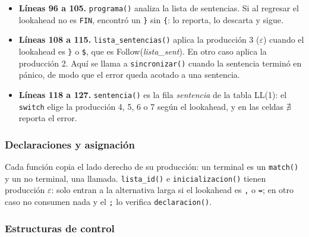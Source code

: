 \documentclass[12pt]{article}
\newcommand{\cmd}[1]{\texttt{\small #1}}
\newcommand{\nt}[1]{\textit{#1}}
\begin{document}


\begin{itemize}[leftmargin=1.1cm,itemsep=0.25em]
\item \textbf{Líneas 96 a 105.} \cmd{programa()} analiza la lista de sentencias. Si al regresar
el lookahead no es \cmd{FIN}, encontró un \cmd{\}} sin \cmd{\{}: lo reporta, lo descarta y sigue.
\item \textbf{Líneas 108 a 115.} \cmd{lista\_sentencias()} aplica la producción 3
($\varepsilon$) cuando el lookahead es \cmd{\}} o \cmd{\$}, que es Follow(\nt{lista\_sent}). En
otro caso aplica la producción 2. Aquí se llama a \cmd{sincronizar()} cuando la sentencia
terminó en pánico, de modo que el error queda acotado a una sentencia.
\item \textbf{Líneas 118 a 127.} \cmd{sentencia()} es la fila \nt{sentencia} de la tabla
LL(1): el \cmd{switch} elige la producción 4, 5, 6 o 7 según el lookahead, y en las celdas
$\nexists$ reporta el error.
\end{itemize}

\subsubsection*{Declaraciones y asignación}



Cada función copia el lado derecho de su producción: un terminal es un \cmd{match()} y un no
terminal, una llamada. \cmd{lista\_id()} e \cmd{inicializacion()} tienen producción
$\varepsilon$: solo entran a la alternativa larga si el lookahead es \cmd{,} o \cmd{=}; en otro
caso no consumen nada y el \cmd{;} lo verifica \cmd{declaracion()}.

\subsubsection*{Estructuras de control}


\end{document}
